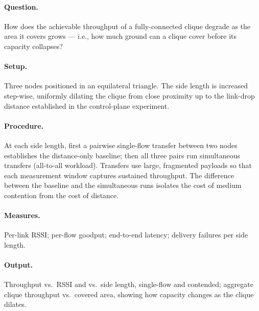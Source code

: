 \paragraph{Question.} How does the achievable throughput of a fully-connected clique
degrade as the area it covers grows --- i.e., how much ground can a clique cover
before its capacity collapses?

\paragraph{Setup.} Three nodes positioned in an equilateral triangle. The side length
is increased step-wise, uniformly dilating the clique from close proximity up to the
link-drop distance established in the control-plane experiment.

\paragraph{Procedure.} At each side length, first a pairwise single-flow transfer
between two nodes establishes the distance-only baseline; then all three pairs run
simultaneous transfers (all-to-all workload). Transfers use large, fragmented
payloads so that each measurement window captures sustained throughput. The
difference between the baseline and the simultaneous runs isolates the cost of
medium contention from the cost of distance.

\paragraph{Measures.} Per-link RSSI; per-flow goodput; end-to-end latency; delivery
failures per side length.

\paragraph{Output.} Throughput vs.\ RSSI and vs.\ side length, single-flow and
contended; aggregate clique throughput vs.\ covered area, showing how capacity
changes as the clique dilates.


